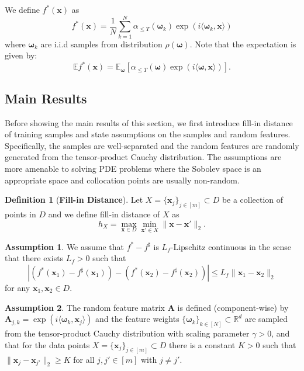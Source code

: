 \documentclass[11pt,twoside]{article}
\theoremstyle{plain}
\theoremstyle{definition}
\newtheorem{definition}{Definition}
\newtheorem{assumption}{Assumption}
\theoremstyle{remark}
\newcommand{\R}{\mathbb{R}}
\newcommand{\E}{\mathbb{E}}
\newcommand{\Ab}{\mathbf{A}}
\newcommand{\xb}{\mathbf{x}}
\newcommand{\omegab}{\boldsymbol\omega}
\begin{document}
We define $f^*(\xb)$ as
\begin{equation}
\label{rf_best}
f^*(\xb) = 
\frac{1}{N}\sum_{k=1}^N \alpha_{\leq T}(\omegab_k) \exp(i\langle \omegab_k,\xb\rangle)
\end{equation}
where $\omegab_k$ are i.i.d samples from distribution $\rho(\omegab)$.
Note that the expectation is given by:
$$\E f^*(\xb) = \E_{\omegab} \left[ \alpha_{\leq T}(\omegab)\exp(i\langle \omegab,\xb\rangle) \right].$$

\subsection{Main Results}
Before showing the main results of this section, we first introduce fill-in distance of training samples and state assumptions on the samples and random features. Specifically, the samples are well-separated and the random features are randomly generated from the tensor-product Cauchy distribution. The assumptions are more amenable to solving PDE problems where the Sobolev space is an appropriate space and collocation points are usually non-random. 

\begin{definition}[{\bf Fill-in Distance}]
Let $X = \{\xb_j\}_{j\in[m]} \subset D$ be a collection of points in $D$ and we define fill-in distance of $X$ as
$$
h_X = \max_{\xb\in D} \min_{\xb'\in X} \|\xb-\xb'\|_2.
$$
\end{definition}

\begin{assumption}
\label{Assmps:Lipschitz_RF}
We assume that $f^*-f^\sharp$ is $L_f$-Lipschitz continuous in the sense that there exists $L_f>0$ such that 
$$\left| \left(f^*(\xb_1)-f^\sharp(\xb_1)\right) - \left(f^*(\xb_2)-f^\sharp(\xb_2)\right) \right| \leq L_f \|\xb_1 - \xb_2\|_2 $$ 
for any $\xb_1, \xb_2\in D$. 
\end{assumption}

\begin{assumption}
\label{Assmps:data}
The random feature matrix $\Ab$ is defined (component-wise) by $\Ab_{j,k} = \exp(i\langle \omegab_k, \xb_j\rangle)$ and the feature weights $\{ \omegab_k\}_{k\in[N]} \subset\R^d$ are sampled from the tensor-product Cauchy distribution with scaling parameter $\gamma>0$, and that for the data points $X = \{\xb_j\}_{j\in[m]} \subset D$ there is a constant $K>0$ such that $\|\xb_j-\xb_{j'}\|_2\geq K$ for all $j,j'\in[m]$ with $j\neq j'$.
\end{assumption}
\end{document}
